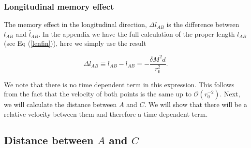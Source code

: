 \documentclass[aps,showpacs,onecolumn,floats,prd,superscriptaddress,nofootinbib]{revtex4-1}
\begin{document}
\subsubsection{Longitudinal memory effect}

The memory effect in the longitudinal direction, $\Delta l_{AB}$ is the difference between $l_{AB}$ and $\bar{l}_{AB}$. In the appendix we have the full calculation of the proper length $l_{AB}$ (see Eq (\ref{lenfin})), here we simply use the result

\begin{equation}
	\Delta l_{AB} \equiv l_{AB} - \bar{l}_{AB} = - \frac{\delta M^2 d}{r_0^2}.
\end{equation}

We note that there is no time dependent term in this expression. This follows from the fact that the velocity of both points is the same up to $\mathcal{O}(r_0^{-2})$.
Next, we will calculate the distance between $A$ and $C$. We will show that there will be a relative velocity between them and therefore a time dependent term. 

\subsection{Distance between $A$ and $C$}
\end{document}
